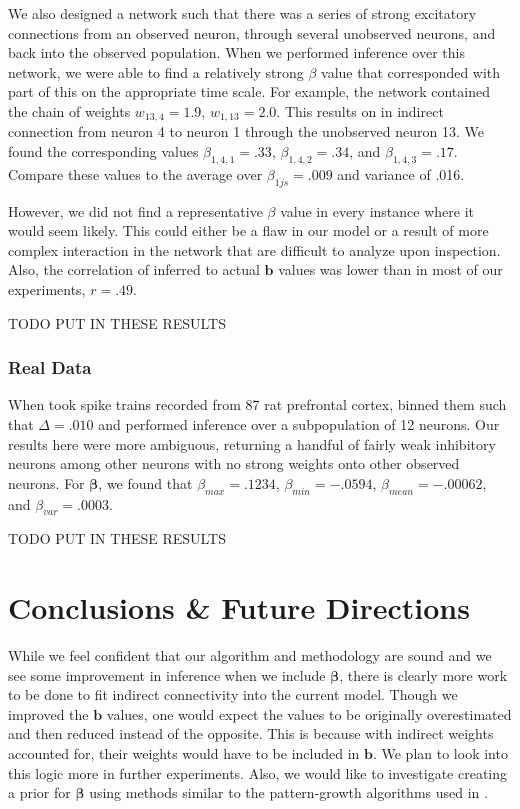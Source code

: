 \documentclass{article}
\begin{document}
We also designed a network such that there was a series of strong excitatory connections from an observed neuron, through several unobserved neurons, and back into the observed population.  When we performed inference over this network, we were able to find a relatively strong $\beta$ value that corresponded with part of this on the appropriate time scale. For example, the network contained the chain of weights $w_{13,4}=1.9$, $w_{1,13}=2.0$. This results on in indirect connection from neuron 4 to neuron 1 through the unobserved neuron 13. We found the corresponding values $\beta_{1,4,1}=.33$, $\beta_{1,4,2}=.34$, and $\beta_{1,4,3}=.17$. Compare these values to the average over $\beta_{1js}=.009$ and variance of .016.

However, we did not find a representative $\beta$ value in every instance where it would seem likely. This could either be a flaw in our model or a result of more complex interaction in the network that are difficult to analyze upon inspection. Also, the correlation of inferred to actual $\mathbf{b}$ values was lower than in most of our experiments, $r=.49$.

TODO PUT IN THESE RESULTS

\subsubsection{Real Data}

When took spike trains recorded from 87 rat prefrontal cortex, binned them such that $\Delta = .010$ and performed inference over a subpopulation of 12 neurons. Our results here were more ambiguous, returning a handful of fairly weak inhibitory neurons among other neurons with no strong weights onto other observed neurons. For  $\bm{\beta}$, we found that $\beta_{max}=.1234$, $\beta_{min}=-.0594$, $\beta_{mean}=-.00062$, and $\beta_{var}=.0003$.

TODO PUT IN THESE RESULTS

\section{Conclusions \& Future Directions}

While we feel confident that our algorithm and methodology are sound and we see some improvement in inference when we include $\bm{\beta}$, there is clearly more work to be done to fit indirect connectivity into the current model. Though we improved the $\mathbf{b}$ values, one would expect the values to be originally overestimated and then reduced instead of the opposite. This is because with indirect weights accounted for, their weights would have to be included in $\mathbf{b}$. We plan to look into this logic more in further experiments. Also, we would like to investigate creating a prior for $\bm{\beta}$ using methods similar to the pattern-growth algorithms used in \citep{patnaik2011}.
\end{document}
